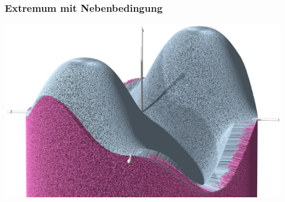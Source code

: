 %
%
%
\bgroup
\begin{frame}[t]
\setlength{\abovedisplayskip}{5pt}
\setlength{\belowdisplayskip}{5pt}
\frametitle{Extremum mit Nebenbedingung}
\vspace*{-0.2cm}
\begin{center}
\includegraphics[width=12.3cm]{../../buch/chapters/010-fuvar/images/lagrangezyl.jpg}
\end{center}
\end{frame}
\egroup
